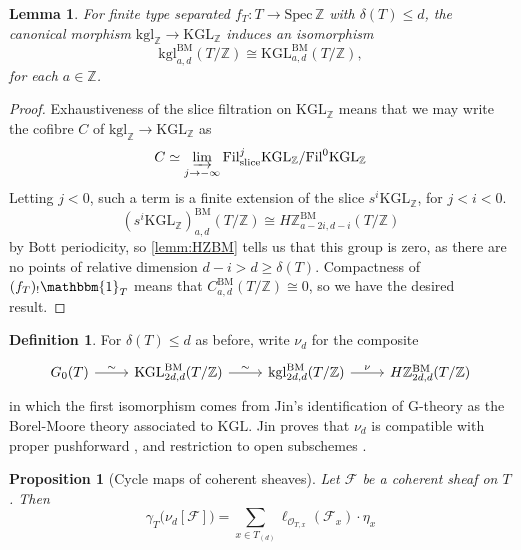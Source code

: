 \documentclass[11pt, twoside]{article}
\numberwithin{equation}{section}
\newtheorem{lemma}[equation]{Lemma}
\newtheorem{proposition}[equation]{Proposition}
\theoremstyle{definition}
\newtheorem{definition}[equation]{Definition}
\newcommand{\bb}[1]{\mathbb{#1}}
\newcommand{\colim}{\varinjlim}
\newcommand{\spec}{\mathrm{Spec} \,}
\newcommand{\fil}{\mathrm{Fil}}
\newcommand{\Kgl}{\mathrm{KGL}}
\newcommand{\kgl}{\mathrm{kgl}}
\newcommand{\bm}{\mathrm{BM}}
\newcommand{\G}{\mathrm{G}}
\newcommand{\sli}{\mathrm{slice}}
\begin{document}
\begin{lemma}
For finite type separated \(f_T \colon T \to \spec \bb{Z}\) with \(\delta(T) \leq d\), the canonical morphism \(\kgl_\bb{Z} \to \Kgl_\bb{Z}\) induces an isomorphism 
\[\kgl_{a, d}^\bm(T/\bb{Z}) \cong \Kgl_{a, d}^\bm(T/\bb{Z}),\]
for each \(a \in \bb{Z}\). 
\end{lemma}

\begin{proof}
Exhaustiveness of the slice filtration on \(\Kgl_\bb{Z}\) means that we may write the cofibre \(C\) of \(\kgl_\bb{Z} \to \Kgl_\bb{Z}\) as 
\[C \simeq \colim_{j \to - \infty} \fil_\sli^j \Kgl_\bb{Z} / \fil^0 \Kgl_\bb{Z}\]
Letting \(j < 0\), such a term is a finite extension of the slice \(s^i \Kgl_\bb{Z}\), for \(j < i < 0\). 
\[(s^i \Kgl_\bb{Z})_{a, d}^\bm(T/\bb{Z}) \cong H\bb{Z}_{a - 2i, d - i}^\bm(T/\bb{Z})\]
by Bott periodicity, so \ref{lemm:HZBM} tells us that this group is zero, as there are no points of relative dimension \(d - i > d \geq \delta(T)\). Compactness of \((f_T)_!\mathbbm{1}_T\) means that \(C_{a, d}^\bm(T/\bb{Z}) \cong 0\), so we have the desired result.
\end{proof}

\begin{definition}
For \(\delta(T) \leq d\) as before, write \(\nu_d\) for the composite 
\[\begin{tikzcd}
G_0(T) \ar[r, "\sim"] & \Kgl_{2d, d}^\bm(T/\bb{Z}) \ar[r, "\sim"] & \kgl_{2d, d}^\bm(T/\bb{Z}) \ar[r, "\nu"] & H\bb{Z}_{2d, d}^\bm(T/\bb{Z})
\end{tikzcd}\]
in which the first isomorphism comes from Jin's identification of \(\G\)-theory as the Borel-Moore theory associated to \(\Kgl\). Jin proves that \(\nu_d\) is compatible with proper pushforward \cite[Lemma 3.3.4]{Jin}, and restriction to open subschemes \cite[Lemma 3.3.5]{Jin}.
\end{definition}

\begin{proposition}[Cycle maps of coherent sheaves]\label{prop:cyc-coh}
Let \(\mathcal{F}\) be a coherent sheaf on \(T\). Then 
\begin{equation}
\gamma_T\big(\nu_d[\mathcal{F}]\big) = \sum_{x \in T_{(d)}} \ell_{\mathscr{O}_{T, x}}(\mathcal{F}_x) \cdot \eta_x
\end{equation}
\end{proposition}
\end{document}
